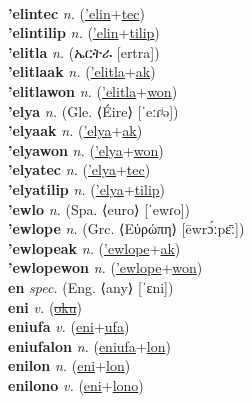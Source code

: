 \label{'elin'kilistosfitilip} \\
\textbf{'elintec} \textit{n.} (\hyperref['elin]{'elin}+\hyperref[tec]{tec})
 \label{'elintec} \\
\textbf{'elintilip} \textit{n.} (\hyperref['elin]{'elin}+\hyperref[tilip]{tilip})
 \label{'elintilip} \\
\textbf{'elitla} \textit{n.} ({\ethiopic{}ኤርትራ} [ertra])
 \label{'elitla} \\
\textbf{'elitlaak} \textit{n.} (\hyperref['elitla]{'elitla}+\hyperref[ak]{ak})
 \label{'elitlaak} \\
\textbf{'elitlawon} \textit{n.} (\hyperref['elitla]{'elitla}+\hyperref[won]{won})
 \label{'elitlawon} \\
\textbf{'elya} \textit{n.} (Gle. ⟨Éire⟩ [ˈeːɾʲə])
 \label{'elya} \\
\textbf{'elyaak} \textit{n.} (\hyperref['elya]{'elya}+\hyperref[ak]{ak})
 \label{'elyaak} \\
\textbf{'elyawon} \textit{n.} (\hyperref['elya]{'elya}+\hyperref[won]{won})
 \label{'elyawon} \\
\textbf{'elyatec} \textit{n.} (\hyperref['elya]{'elya}+\hyperref[tec]{tec})
 \label{'elyatec} \\
\textbf{'elyatilip} \textit{n.} (\hyperref['elya]{'elya}+\hyperref[tilip]{tilip})
 \label{'elyatilip} \\
\textbf{'ewlo} \textit{n.} (Spa. ⟨euro⟩ [ˈewɾo])
 \label{'ewlo} \\
\textbf{'ewlope} \textit{n.} (Grc. ⟨Εὐρώπη⟩ [ēwrɔ́ːpɛ̄ː])
 \label{'ewlope} \\
\textbf{'ewlopeak} \textit{n.} (\hyperref['ewlope]{'ewlope}+\hyperref[ak]{ak})
 \label{'ewlopeak} \\
\textbf{'ewlopewon} \textit{n.} (\hyperref['ewlope]{'ewlope}+\hyperref[won]{won})
 \label{'ewlopewon} \\
\textbf{en} \textit{spec.} (Eng. ⟨any⟩ [ˈɛni])
 \label{en} \\
\textbf{eni} \textit{v.} (\hyperref[oku]{\sout{oku}})
 \label{eni} \\
\textbf{eniufa} \textit{v.} (\hyperref[eni]{eni}+\hyperref[ufa]{ufa})
 \label{eniufa} \\
\textbf{eniufalon} \textit{n.} (\hyperref[eniufa]{eniufa}+\hyperref[lon]{lon})
 \label{eniufalon} \\
\textbf{enilon} \textit{n.} (\hyperref[eni]{eni}+\hyperref[lon]{lon})
 \label{enilon} \\
\textbf{enilono} \textit{v.} (\hyperref[eni]{eni}+\hyperref[lono]{lono})

